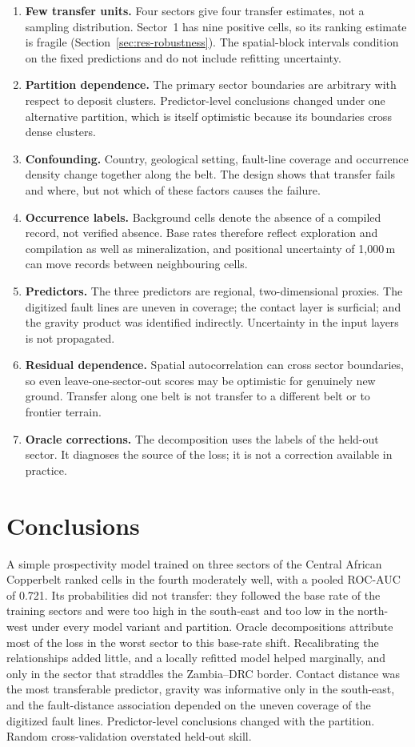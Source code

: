 \documentclass[pdflatex,sn-basic]{sn-jnl}%
\begin{document}
\begin{enumerate}
\item \textbf{Few transfer units.} Four sectors give four transfer estimates, not a sampling distribution. Sector~1 has nine positive cells, so its ranking estimate is fragile (Section~\ref{sec:res-robustness}). The spatial-block intervals condition on the fixed predictions and do not include refitting uncertainty.
\item \textbf{Partition dependence.} The primary sector boundaries are arbitrary with respect to deposit clusters. Predictor-level conclusions changed under one alternative partition, which is itself optimistic because its boundaries cross dense clusters.
\item \textbf{Confounding.} Country, geological setting, fault-line coverage and occurrence density change together along the belt. The design shows that transfer fails and where, but not which of these factors causes the failure.
\item \textbf{Occurrence labels.} Background cells denote the absence of a compiled record, not verified absence. Base rates therefore reflect exploration and compilation as well as mineralization, and positional uncertainty of 1,000\,m can move records between neighbouring cells.
\item \textbf{Predictors.} The three predictors are regional, two-dimensional proxies. The digitized fault lines are uneven in coverage; the contact layer is surficial; and the gravity product was identified indirectly. Uncertainty in the input layers is not propagated.
\item \textbf{Residual dependence.} Spatial autocorrelation can cross sector boundaries, so even leave-one-sector-out scores may be optimistic for genuinely new ground. Transfer along one belt is not transfer to a different belt or to frontier terrain.
\item \textbf{Oracle corrections.} The decomposition uses the labels of the held-out sector. It diagnoses the source of the loss; it is not a correction available in practice.
\end{enumerate}

\section{Conclusions}

A simple prospectivity model trained on three sectors of the Central African Copperbelt ranked cells in the fourth moderately well, with a pooled ROC-AUC of 0.721. Its probabilities did not transfer: they followed the base rate of the training sectors and were too high in the south-east and too low in the north-west under every model variant and partition. Oracle decompositions attribute most of the loss in the worst sector to this base-rate shift. Recalibrating the relationships added little, and a locally refitted model helped marginally, and only in the sector that straddles the Zambia--DRC border. Contact distance was the most transferable predictor, gravity was informative only in the south-east, and the fault-distance association depended on the uneven coverage of the digitized fault lines. Predictor-level conclusions changed with the partition. Random cross-validation overstated held-out skill.
\end{document}
